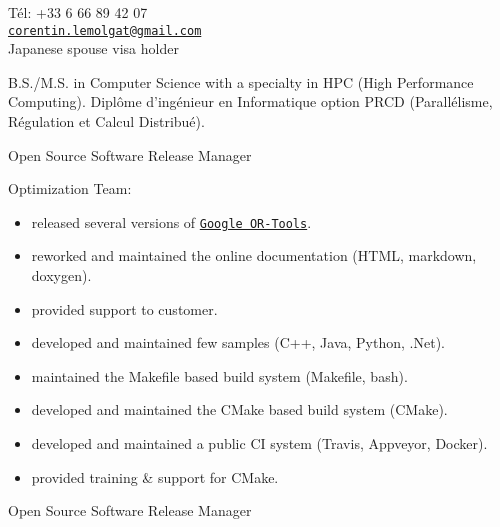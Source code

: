 \documentclass{article}
\begin{document}


T\'{e}l: +33 6 66 89 42 07\\
\href{mailto:corentin.lemolgat@gmail.com}{\texttt{corentin.lemolgat@gmail.com}}\\
Japanese spouse visa holder\\

\begin{llist}
 
 {
B.S./M.S. in Computer Science with a specialty in HPC (High Performance Computing).
} {
Dipl\^{o}me d'ing\'{e}nieur en Informatique option PRCD (Parall\'{e}lisme,
R\'{e}gulation et Calcul Distribu\'{e}).
}

{}
{}
\vspace{-0.33cm}

 {
Open Source Software Release Manager \\
\vspace{-0.33cm}

Optimization Team:
\vspace{-0.33cm}
\begin{itemize}
\item released several versions of \href{https://github.com/google/or-tools}{\texttt{Google OR-Tools}}.
\item reworked and maintained the online documentation (HTML, markdown, doxygen).
\item provided support to customer.
\item developed and maintained few samples (C++, Java, Python, .Net).
\item maintained the Makefile based build system (Makefile, bash).
\item developed and maintained the CMake based build system (CMake).
\item developed and maintained a public CI system (Travis, Appveyor, Docker).
\item provided training \& support for CMake.
\end{itemize}
}{
Open Source Software Release Manager \\
\vspace{-0.33cm}

}
\end{llist}
\end{document}
